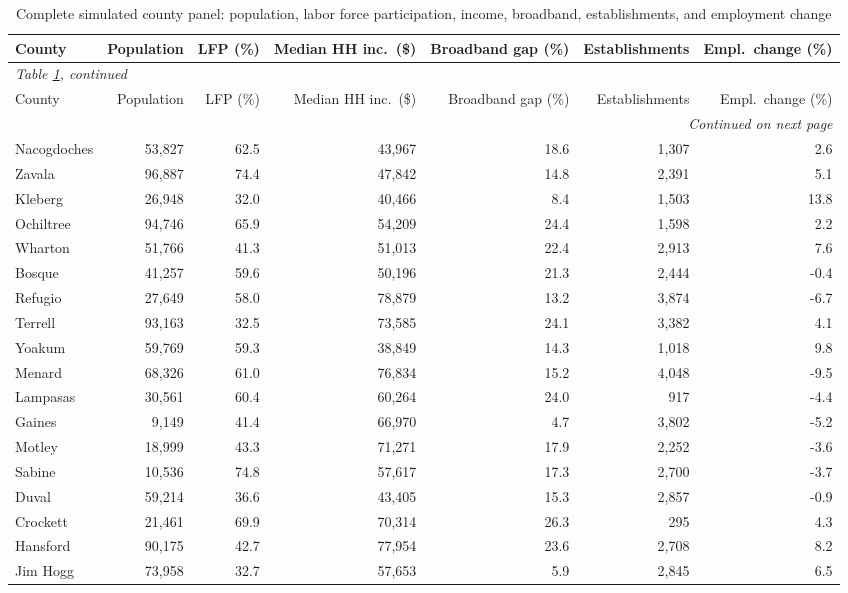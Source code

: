 \documentclass[11pt]{article}
\begin{document}
\begin{landscape}
\begin{longtable}{lrrrrrr}
\caption{Complete simulated county panel: population, labor force participation, income, broadband, establishments, and employment change}
\label{tab:panel} \\
\toprule
County & Population & LFP (\%) & Median HH inc.\ (\$) & Broadband gap (\%) & Establishments & Empl.\ change (\%) \\
\midrule
\endfirsthead
\multicolumn{7}{l}{\small\emph{Table \ref{tab:panel}, continued}} \\
\toprule
County & Population & LFP (\%) & Median HH inc.\ (\$) & Broadband gap (\%) & Establishments & Empl.\ change (\%) \\
\midrule
\endhead
\midrule
\multicolumn{7}{r}{\small\emph{Continued on next page}} \\
\endfoot
\bottomrule
\endlastfoot
Nacogdoches & 53,827 & 62.5 & 43,967 & 18.6 & 1,307 & 2.6 \\
Zavala & 96,887 & 74.4 & 47,842 & 14.8 & 2,391 & 5.1 \\
Kleberg & 26,948 & 32.0 & 40,466 & 8.4 & 1,503 & 13.8 \\
Ochiltree & 94,746 & 65.9 & 54,209 & 24.4 & 1,598 & 2.2 \\
Wharton & 51,766 & 41.3 & 51,013 & 22.4 & 2,913 & 7.6 \\
Bosque & 41,257 & 59.6 & 50,196 & 21.3 & 2,444 & -0.4 \\
Refugio & 27,649 & 58.0 & 78,879 & 13.2 & 3,874 & -6.7 \\
Terrell & 93,163 & 32.5 & 73,585 & 24.1 & 3,382 & 4.1 \\
Yoakum & 59,769 & 59.3 & 38,849 & 14.3 & 1,018 & 9.8 \\
Menard & 68,326 & 61.0 & 76,834 & 15.2 & 4,048 & -9.5 \\
Lampasas & 30,561 & 60.4 & 60,264 & 24.0 & 917 & -4.4 \\
Gaines & 9,149 & 41.4 & 66,970 & 4.7 & 3,802 & -5.2 \\
Motley & 18,999 & 43.3 & 71,271 & 17.9 & 2,252 & -3.6 \\
Sabine & 10,536 & 74.8 & 57,617 & 17.3 & 2,700 & -3.7 \\
Duval & 59,214 & 36.6 & 43,405 & 15.3 & 2,857 & -0.9 \\
Crockett & 21,461 & 69.9 & 70,314 & 26.3 & 295 & 4.3 \\
Hansford & 90,175 & 42.7 & 77,954 & 23.6 & 2,708 & 8.2 \\
Jim Hogg & 73,958 & 32.7 & 57,653 & 5.9 & 2,845 & 6.5 \\

\end{longtable}
\end{landscape}
\end{document}
